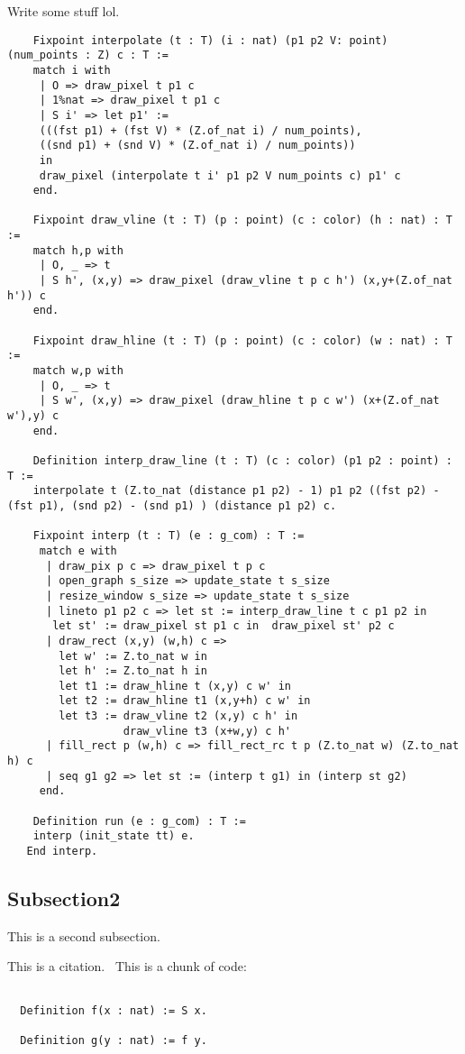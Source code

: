 \documentclass{llncs}
\begin{document}
  Write some stuff lol.
 \begin{lstlisting}
    Fixpoint interpolate (t : T) (i : nat) (p1 p2 V: point) (num_points : Z) c : T :=
    match i with
     | O => draw_pixel t p1 c
     | 1%nat => draw_pixel t p1 c
     | S i' => let p1' :=
     (((fst p1) + (fst V) * (Z.of_nat i) / num_points),
     ((snd p1) + (snd V) * (Z.of_nat i) / num_points))
     in
     draw_pixel (interpolate t i' p1 p2 V num_points c) p1' c 
    end.

    Fixpoint draw_vline (t : T) (p : point) (c : color) (h : nat) : T :=
    match h,p with
     | O, _ => t
     | S h', (x,y) => draw_pixel (draw_vline t p c h') (x,y+(Z.of_nat h')) c
    end.

    Fixpoint draw_hline (t : T) (p : point) (c : color) (w : nat) : T :=
    match w,p with
     | O, _ => t
     | S w', (x,y) => draw_pixel (draw_hline t p c w') (x+(Z.of_nat w'),y) c
    end.

    Definition interp_draw_line (t : T) (c : color) (p1 p2 : point) : T :=
    interpolate t (Z.to_nat (distance p1 p2) - 1) p1 p2 ((fst p2) - (fst p1), (snd p2) - (snd p1) ) (distance p1 p2) c.

    Fixpoint interp (t : T) (e : g_com) : T :=
     match e with
      | draw_pix p c => draw_pixel t p c
      | open_graph s_size => update_state t s_size
      | resize_window s_size => update_state t s_size 
      | lineto p1 p2 c => let st := interp_draw_line t c p1 p2 in 
       let st' := draw_pixel st p1 c in  draw_pixel st' p2 c
      | draw_rect (x,y) (w,h) c =>
        let w' := Z.to_nat w in
        let h' := Z.to_nat h in
        let t1 := draw_hline t (x,y) c w' in
        let t2 := draw_hline t1 (x,y+h) c w' in
        let t3 := draw_vline t2 (x,y) c h' in
                  draw_vline t3 (x+w,y) c h'
      | fill_rect p (w,h) c => fill_rect_rc t p (Z.to_nat w) (Z.to_nat h) c
      | seq g1 g2 => let st := (interp t g1) in (interp st g2)
     end.

    Definition run (e : g_com) : T :=
    interp (init_state tt) e.
   End interp.
 \end{lstlisting}
\subsection{Subsection2} This is a second subsection.



This is a citation.~\cite{gennaro2010non}
This is a chunk of code:

\begin{lstlisting}

  Definition f(x : nat) := S x.

  Definition g(y : nat) := f y.

\end{lstlisting}
\end{document}
